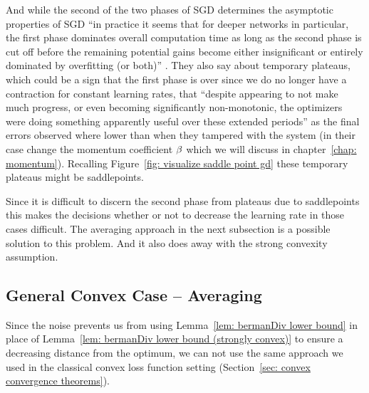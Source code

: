 And while the second of the two phases of SGD \parencite[first observed
by][]{darkenFasterStochasticGradient1991} determines the asymptotic properties
of SGD  ``in practice it seems that for deeper networks in particular, the first
phase dominates overall computation time as long as the second phase is cut off
before the remaining potential gains become either insignificant or entirely
dominated by overfitting (or both)''  
\parencite{sutskeverImportanceInitializationMomentum2013}. They also say about
temporary plateaus, which could be a sign that the first phase is over since
we do no longer have a contraction for constant learning rates, that 
``despite appearing to not make much progress, or even becoming significantly
non-monotonic, the optimizers were doing something apparently useful over these
extended periods'' as the final errors observed where lower than when they
tampered with the system (in their case change the momentum coefficient
\(\beta\) which we will discuss in chapter~\ref{chap: momentum}).
Recalling Figure~\ref{fig: visualize saddle point gd} these temporary plateaus
might be saddlepoints.

Since it is difficult to discern the second phase from plateaus due to saddlepoints
this makes the decisions whether or not to decrease the learning rate in those
cases difficult. The averaging approach in the next subsection is a possible
solution to this problem. And it also does away with the strong convexity
assumption.

\subsection{General Convex Case -- Averaging}\label{subsec: SGD with Averaging}

Since the noise prevents us from using Lemma~\ref{lem: bermanDiv lower bound} in
place of Lemma~\ref{lem: bermanDiv lower bound (strongly convex)} to ensure a
decreasing distance from the optimum, we can not use the same approach we used
in the classical convex loss function setting (Section~\ref{sec: convex convergence theorems}).

